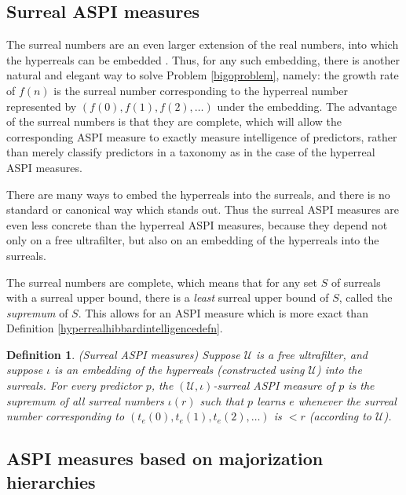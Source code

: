 \documentclass{article}
\newtheorem{definition}[theorem]{Definition}
\begin{document}
\subsection{Surreal ASPI measures}

The surreal numbers \cite{conway} \cite{knuth} are an even larger extension
of the real numbers, into which the hyperreals can be embedded
\cite{ehrlich2012absolute}.
Thus, for any such embedding,
there is another natural and elegant way to solve Problem \ref{bigoproblem},
namely: the growth rate of $f(n)$ is the surreal number corresponding to the
hyperreal number represented by $(f(0),f(1),f(2),\ldots)$ under the embedding.
The advantage of the surreal numbers is that they are complete, which will allow
the corresponding ASPI measure to exactly measure intelligence of predictors,
rather than merely classify predictors in a taxonomy as in the case of
the hyperreal ASPI measures.

There are many ways to embed the hyperreals into the surreals, and there is no
standard or canonical way which stands out. Thus the surreal ASPI measures are even less
concrete than the hyperreal ASPI measures, because they depend not only on a
free ultrafilter, but also on an embedding of the hyperreals into the surreals.

The surreal numbers are complete, which means that for
any set $S$ of surreals with a surreal upper bound,
there is a \emph{least} surreal upper bound of $S$, called the \emph{supremum} of $S$.
This allows for an ASPI measure which is more exact
than Definition \ref{hyperrealhibbardintelligencedefn}.

\begin{definition}
\label{surrealhibbardintelligencedefn}
    (Surreal ASPI measures)
    Suppose $\mathcal U$ is a free ultrafilter, and suppose $\iota$ is an embedding
    of the hyperreals (constructed using $\mathcal U$) into the surreals.
    For every predictor $p$, the \emph{$(\mathcal U,\iota)$-surreal ASPI measure} of $p$
    is the supremum of all surreal numbers $\iota(r)$ such that
    $p$ learns $e$ whenever the surreal number corresponding to
    $(t_e(0),t_e(1),t_e(2),\ldots)$ is $<r$ (according to $\mathcal U$).
\end{definition}

\subsection{ASPI measures based on majorization hierarchies}
\end{document}
